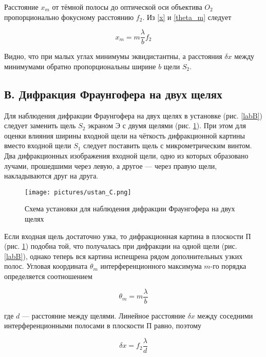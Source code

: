 \documentclass[a4paper,12pt]{article}
\begin{document}
Расстояние $ x_m $ от тёмной полосы до оптической оси объектива $ O_2 $ пропорционально фокусному расстоянию $ f_2 $. Из \eqref{x} и \eqref{theta_m} следует 

\begin{equation}\label{xm}
x_m = m \dfrac{\lambda}{b} f_2
\end{equation}

Видно, что при малых углах минимумы эквидистантны, а расстояния $ \delta x $ между минимумами обратно пропорциональны ширине $ b $ щели $ S_2 $.



\subsection*{В. Дифракция Фраунгофера на двух щелях}

Для наблюдения дифракции Фраунгофера на двух щелях в установке (рис. \ref{labB}) следует заменить щель $ S_2 $ экраном Э с двумя щелями
(рис. \ref{labC}). При этом для оценки влияния ширины входной щели на чёткость дифракционной картины вместо входной щели $ S_1 $ следует поставить щель с микрометрическим винтом. Два дифракционных изображения входной щели, одно из которых образовано лучами, прошедшими через левую, а другое --- через правую щели, накладываются друг на друга.

\FloatBarrier
\begin{figure}[h]
	\centering
	\texttt{[image: pictures/ustan\_C.png]}
	\caption{Схема установки для наблюдения дифракции Фраунгофера на двух щелях}
	\label{labC}
\end{figure}
\FloatBarrier

Если входная щель достаточно узка, то дифракционная картина
в плоскости П (рис. \ref{labC}) подобна той, что получалась при дифракции
на одной щели (рис. \ref{labB}), однако теперь вся картина испещрена рядом
дополнительных узких полос.
Угловая координата $ \theta_m $ интерференционного максимума $ m $-го порядка определяется соотношением

\begin{equation}\label{}
\theta_m = m \dfrac{\lambda}{b}
\end{equation}

где $ d $ --- расстояние между щелями. Линейное расстояние $ \delta x $ между соседними интерференционными полосами в плоскости П равно, поэтому

\begin{equation}\label{dx}
\delta x = f_2 \dfrac{\lambda}{d}
\end{equation}
\end{document}
